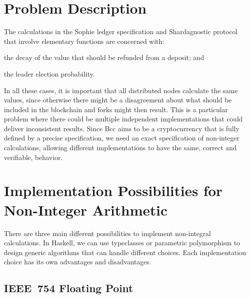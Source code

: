 \documentclass[11pt,a4paper,dvipsnames,twosided]{article}
\theoremstyle{definition}
\theoremstyle{definition}
\begin{document}
\section{Problem Description}
\label{sec:problem-description}

The calculations in the Sophie ledger specification and Shardagnostic protocol that involve elementary functions are concerned with:
\begin{inparaenum}
\item
  the decay of the value that should be refunded from a deposit;
and
\item
  the leader election probability.
\end{inparaenum}
%
In all these cases, it is important that all distributed nodes calculate the
same values, since otherwise there might be a disagreement about what should be
included in the blockchain and forks might then result. This is a particular
problem where there could be multiple independent implementations that could
deliver inconsistent results.  Since Bcc aims to be a cryptocurrency that is
fully defined by a precise specification, we need an exact specification of
non-integer calculations, allowing different implementations to have the same,
correct and verifiable,
behavior.

\section{Implementation Possibilities for Non-Integer Arithmetic}
\label{sec:impl-poss}

There are three main different possibilities to implement non-integral
calculations. In Haskell, we can use typeclasses or parametric polymorphism
to design generic algorithms that can handle different choices. Each implementation choice has its
own advantages and disadvantages.

\subsection{IEEE~754 Floating Point}
\label{sec:ieee-754-floating}
\end{document}
